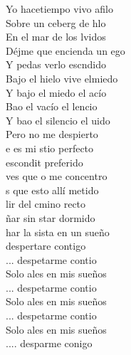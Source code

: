 \begin{cancion}[Despertar][Estopa]
	  Yo hacetiempo vivo afilo\\
	  Sobre un ceberg de hlo\\
	    En el mar de los lvidos\\
	Déjme que encienda un ego\\
	Y pedas verlo escndido\\
	 Bajo el hielo vive elmiedo\\
	  Y bajo el miedo el acío\\
	Bao el vacío el lencio\\
	Y bao el silencio el uido\\
	    Pero no me despierto\\
	e es mi stio perfecto\\
	 escondit preferido\\
	 ves que o me concentro\\
	s que esto allí metido\\
	lir del cmino recto\\
	ñar sin star dormido\\
	har la sista en un sueño\\
	 despertare contigo\\
	... despetarme contio\\
	Solo ales en mis sueños\\
	... despetarme contio\\
	Solo ales en mis sueños\\
	... despetarme contio\\
	Solo ales en mis sueños\\
	.... desparme conigo\\
	         \\
\end{cancion}%
